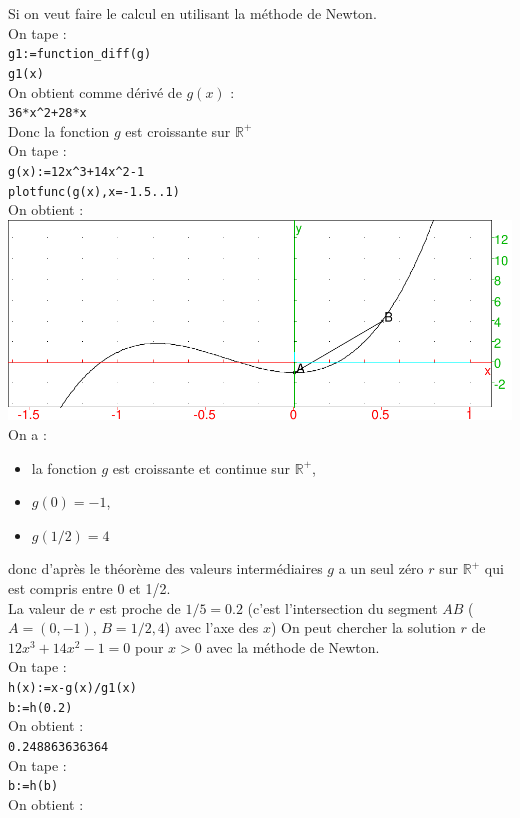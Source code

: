 \documentclass[a4paper,11pt]{book}
\newcommand{\R}{{\mathbb{R}}}
\begin{document}
Si on veut faire  le calcul en utilisant la m\'ethode de Newton.\\
On tape :\\
{\tt g1:=function\_diff(g)}\\
{\tt g1(x)}\\
On obtient comme d\'eriv\'e de $g(x)$ :\\
{\tt 36*x\verb|^|2+28*x}\\
Donc la fonction $g$ est croissante sur $\R^+$\\
On tape :\\
{\tt g(x):=12x\verb|^|3+14x\verb|^|2-1}\\
{\tt plotfunc(g(x),x=-1.5..1)}\\
On obtient :\\
\includegraphics[width=\textwidth]{baceinstein}\\
On a :
\begin{itemize}
\item la fonction $g$ est croissante et continue sur $\R^+$,
\item $g(0)=-1$,
\item $g(1/2)=4$
\end{itemize}
donc d'apr\`es le th\'eor\`eme des valeurs interm\'ediaires $g$ a un seul 
z\'ero $r$ sur $\R^+$ qui est compris entre 0 et 1/2.\\
La valeur de $r$ est  proche de $1/5=0.2$ (c'est l'intersection du segment $AB$
($A=(0,-1)$, $B=1/2,4$) avec l'axe des $x$) 
On peut chercher la solution $r$ de $12x^3+14x^2-1=0$ pour $x>0$ avec la 
m\'ethode de Newton.\\
On tape :\\
{\tt h(x):=x-g(x)/g1(x)}\\
{\tt b:=h(0.2)}\\
On obtient :\\
{\tt 0.248863636364}\\
On tape :\\
{\tt b:=h(b)}\\
On obtient :\\
\end{document}
